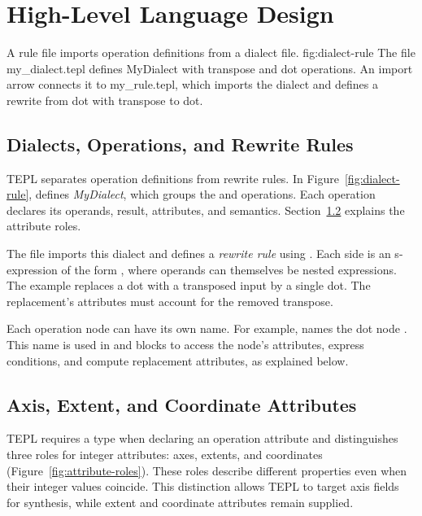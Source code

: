\section{High-Level Language Design}
\label{sec:high-level-language-design}

  {A rule file imports operation definitions from a dialect file.}
  {fig:dialect-rule}
  {The file my_dialect.tepl defines MyDialect with transpose and dot operations. An import arrow connects it to my_rule.tepl, which imports the dialect and defines a rewrite from dot with transpose to dot.}

\subsection{Dialects, Operations, and Rewrite Rules}
\label{sec:dialects-operations-and-rewrite-rules}
TEPL separates operation definitions from rewrite rules.
In Figure~\ref{fig:dialect-rule},  defines
\emph{MyDialect}, which groups the  and 
operations. Each operation declares its operands, result, attributes,
and semantics. Section~\ref{sec:axis-extent-and-coordinate-attributes} explains the attribute roles.

The file  imports this dialect and defines a
\emph{rewrite rule} using .
Each side is an s-expression of the form ,
where operands can themselves be nested expressions.
The example replaces a dot with a transposed input by a single dot.
The replacement's attributes must account for the removed transpose.

Each operation node can have its own name.
For example,  names the dot node .
This name is used in  and  blocks to access
the node's attributes, express conditions, and compute replacement
attributes, as explained below.

\subsection{Axis, Extent, and Coordinate Attributes}
\label{sec:axis-extent-and-coordinate-attributes}

TEPL requires a type when declaring an operation attribute and distinguishes
three roles for integer attributes: axes, extents, and coordinates
(Figure~\ref{fig:attribute-roles}). These roles describe different properties
even when their integer values coincide. This distinction allows TEPL to
target axis fields for synthesis, while extent and coordinate
attributes remain supplied.

